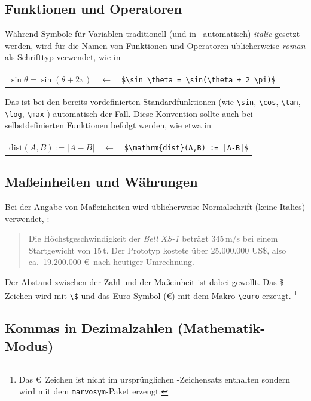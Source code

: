 \subsection{Funktionen und Operatoren}

Während Symbole für Variablen traditionell (und in \latex\ automatisch)
\emph{italic} gesetzt werden, wird für die Namen von Funktionen und
Operatoren üblicherweise \emph{roman} als Schrifttyp verwendet, wie \zB in
%
\begin{center}
	\begin{tabular}{lcl}
		$\sin \theta = \sin(\theta + 2 \pi)$ &
		$\leftarrow$ & \verb!$\sin \theta = \sin(\theta + 2 \pi)$! \\
	\end{tabular}
\end{center}
%
Das ist bei den bereits vordefinierten Standardfunktionen (wie \verb!\sin!,
\verb!\cos!, \verb!\tan!, \verb!\log!, \verb!\max! \uva) automatisch der Fall.
Diese Konvention sollte auch bei selbstdefinierten Funktionen befolgt werden,
wie etwa in
%
\begin{center}
	\begin{tabular}{lcl}
	$\mathrm{dist}(A,B) := |A-B|$ & $\leftarrow$ & 
	\verb!$\mathrm{dist}(A,B) := |A-B|$! \\
	\end{tabular}
\end{center}


\subsection{Maßeinheiten und Währungen}

Bei der Angabe von Maßeinheiten wird üblicherweise Normalschrift (keine
Italics) verwendet, \zB:
%
\begin{quote}
	Die Höchstgeschwindigkeit der \textit{Bell XS-1} beträgt 345\,m/s bei
	einem Startgewicht von 15\,t. Der Prototyp kostete über 25.000.000 US\$,
	also ca.\ 19.200.000 \euro\ nach heutiger Umrechnung.
\end{quote}
%
Der Abstand zwischen der Zahl und der Maßeinheit ist dabei gewollt. Das
\$-Zeichen wird mit \verb!\$! und das Euro-Symbol (\euro) mit dem Makro
\verb!\euro! erzeugt.%
\footnote{Das \euro\ Zeichen ist nicht im ursprünglichen \latex-Zeichensatz
enthalten sondern wird mit dem \texttt{marvosym}-Paket erzeugt.}


\subsection{Kommas in Dezimalzahlen (Mathematik-Modus)}

